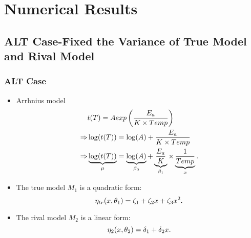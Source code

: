 \documentclass[xcolor=dvipsnames,aspectratio=1610]{beamer}
\begin{document}
\section{Numerical Results}
\subsection{ALT Case-Fixed the Variance of True Model and Rival Model}
\begin{frame}
\frametitle{ALT Case}
\begin{itemize}
\item Arrhnius model
\begin{align}
&t(T)=Aexp\left( \frac{E_a}{K \times Temp} \right)\notag \\ 
\Rightarrow&\log(t(T))=\log(A)+\frac{E_a}{K \times Temp}\notag \\ 
\Rightarrow&\underbrace{\log(t(T))}_{\mu}=\underbrace{\log(A)}_{\beta_0}+\underbrace{\frac{E_a}{K}}_{\beta_1} \times \underbrace{\frac{1}{Temp}}_x. \notag \label{M2 linearized}
\end{align}
\item The true model $M_1$ is a quadratic form:
\begin{equation} \notag 
\eta_{tr}(x,\theta_1)=\zeta_1+\zeta_2x+\zeta_3x^2.
\end{equation}

\item The rival model $M_2$ is a linear form: 
\begin{equation} \notag
\eta_{2}(x,\theta_2)=\delta_1+\delta_2x.
\end{equation}

\end{itemize}

\end{frame}

\end{document}
